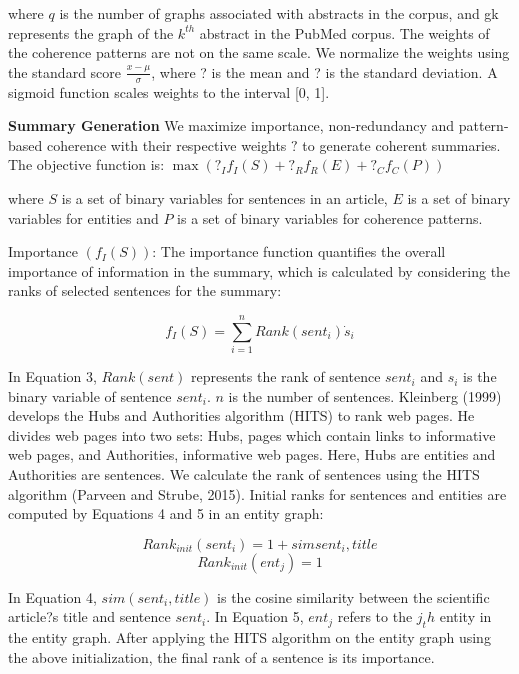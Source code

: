 where $q$ is the number of graphs associated with abstracts in the corpus, and gk represents the graph of the $k^{th}$ abstract in the PubMed corpus.
The weights of the coherence patterns are not on the same scale. 
We normalize the weights using the standard score  $\frac{x-\mu}{\sigma}$, where ? is the mean and ? is the standard deviation. 
A sigmoid function scales weights to the interval [0, 1].


\textbf{Summary Generation}
We maximize importance, non-redundancy and pattern-based coherence with their respective weights $?$ to generate coherent summaries. 
The objective function is:
$\max(?_I f_I(S) + ?_Rf_R(E) + ?_C f_C(P ))$

where $S$ is a set of binary variables for sentences in an article, $E$ is a set of binary variables for entities and $P$ is a set of binary variables for coherence patterns.

Importance $(f_I(S))$: The importance function quantifies the overall importance of information in the summary, which is calculated by considering the ranks of selected sentences for the summary:

\begin{equation}
f_I(S) = \sum_{i=1}^{n}{Rank(sent_i) \dot s_i}
\end{equation}

In Equation 3, $Rank(sent)$ represents the rank of sentence $sent_i$ and $s_i$ is the binary variable of sentence $sent_i$. $n$ is the number of sentences. 
Kleinberg (1999) develops the Hubs and Authorities algorithm (HITS) to rank web pages. 
He divides web pages into two sets: Hubs, pages which contain links to informative web pages, and Authorities, informative web pages. Here, Hubs are entities and Authorities are sentences. 
We calculate the rank of sentences using the HITS algorithm (Parveen and Strube, 2015). 
Initial ranks for sentences and entities are computed by Equations 4 and 5 in an entity graph:

\begin{equation}
Rank_{init}(sent_i)= 1+ sim{sent_i,title}
\end{equation}
\begin{equation}
Rank_{init}(ent_j)= 1
\end{equation}

In Equation 4, $sim(sent_i,title)$ is the cosine similarity between the scientific article?s title and sentence $sent_i$. 
In Equation 5, $ent_j$ refers to the $j_th$ entity in the entity graph. 
After applying the HITS algorithm on the entity graph using the above initialization, the final rank of a sentence is its importance.

